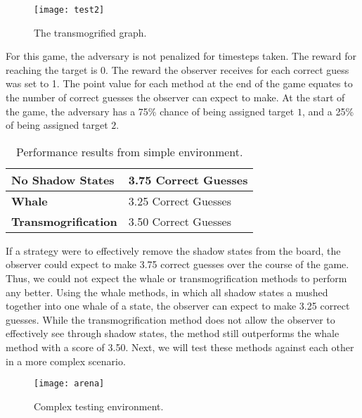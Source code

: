 \begin{figure}[h!]
\begin{center}

  \texttt{[image: test2]}
  \end{center}

  \caption{The transmogrified graph.}
  
  \label{fig:test2}
\end{figure}

For this game, the adversary is not penalized for timesteps taken. The reward for reaching the target is 0. The reward the observer receives for each correct guess was set to 1. The point value for each method at the end of the game equates to the number of correct guesses the observer can expect to make. At the start of the game, the adversary has a 75\% chance of being assigned target $1$, and a 25\% of being assigned target $2$.

\begin{table}[hbtp]
\begin{center}
\begin{tabular}{|l|l|}
\hline 
\textbf{No Shadow States} & 3.75 Correct Guesses\\
\hline
\textbf{Whale} & 3.25 Correct Guesses\\
\hline
\textbf{Transmogrification} & 3.50 Correct Guesses\\
\hline
\end{tabular}
\end{center}
\caption{Performance results from simple environment.}
\label{table:simpletable}
\end{table}

If a strategy were to effectively remove the shadow states from the board, the observer could expect to make 3.75 correct guesses over the course of the game. Thus, we could not expect the whale or transmogrification methods to perform any better. Using the whale methods, in which all shadow states a mushed together into one whale of a state, the observer can expect to make 3.25 correct guesses. While the transmogrification method does not allow the observer to effectively see through shadow states, the method still outperforms the whale method with a score of 3.50. Next, we will test these methods against each other in a more complex scenario.  

\begin{figure}[h!]
\begin{center}

  \texttt{[image: arena]}
  \end{center}

  \caption{Complex testing environment.}
  
  \label{fig:arena}
\end{figure}

